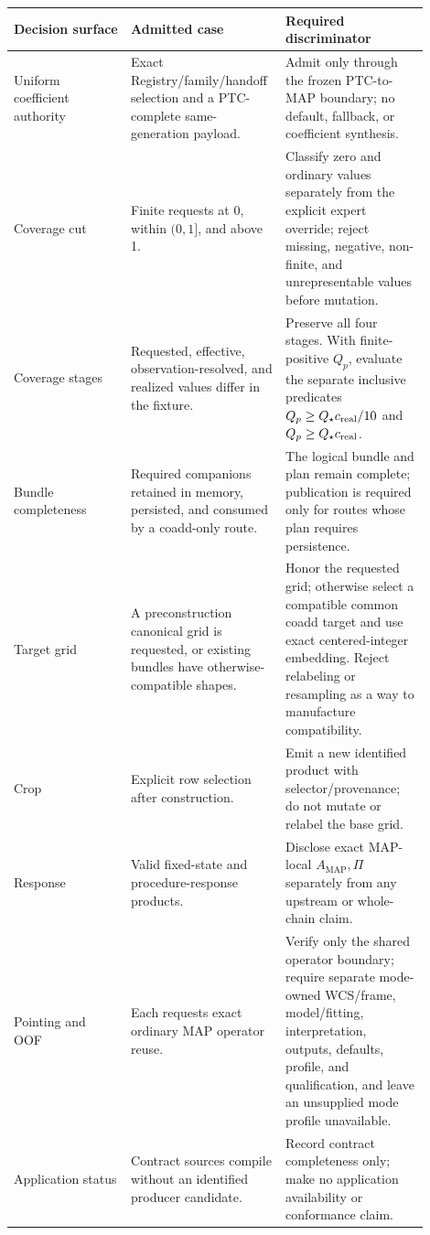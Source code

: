 \documentclass[10pt]{article}
\begin{document}
\begin{longtable}{L{0.27\linewidth}L{0.30\linewidth}L{0.33\linewidth}}
\toprule
Decision surface & Admitted case & Required discriminator\\
\midrule
Uniform coefficient authority & Exact Registry/family/handoff selection and a
PTC-complete same-generation payload. & Admit only through the frozen
PTC-to-MAP boundary; no default, fallback, or coefficient synthesis.\\
Coverage cut & Finite requests at 0, within \((0,1]\), and above 1. & Classify
zero and ordinary values separately from the explicit expert override; reject
missing, negative, non-finite, and unrepresentable values before mutation.\\
Coverage stages & Requested, effective, observation-resolved, and realized
values differ in the fixture. & Preserve all four stages.  With finite-positive
\(Q_p\), evaluate the separate inclusive predicates
\(Q_p\ge Q_\star c_{\rm real}/10\) and
\(Q_p\ge Q_\star c_{\rm real}\).\\
Bundle completeness & Required companions retained in memory, persisted, and
consumed by a coadd-only route. & The logical bundle and plan remain complete;
publication is required only for routes whose plan requires persistence.\\
Target grid & A preconstruction canonical grid is requested, or existing
bundles have otherwise-compatible shapes. & Honor the requested grid; otherwise
select a compatible common coadd target and use exact centered-integer
embedding.  Reject relabeling or resampling as a way to manufacture
compatibility.\\
Crop & Explicit row selection after construction. & Emit a new identified
product with selector/provenance; do not mutate or relabel the base grid.\\
Response & Valid fixed-state and procedure-response products. & Disclose exact
MAP-local \(A_{\mathrm{MAP}},\Pi\) separately from any upstream or whole-chain
claim.\\
Pointing and OOF & Each requests exact ordinary MAP operator reuse. & Verify
only the shared operator boundary; require separate mode-owned WCS/frame,
model/fitting, interpretation, outputs, defaults, profile, and qualification,
and leave an unsupplied mode profile unavailable.\\
Application status & Contract sources compile without an identified producer
candidate. & Record contract completeness only; make no application
availability or conformance claim.\\
\bottomrule
\end{longtable}
\end{document}
